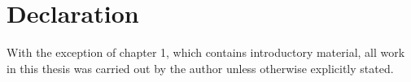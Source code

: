 \chapter{Declaration}

With the exception of chapter 1, which contains introductory material, all work in this thesis was carried out by the author unless otherwise explicitly stated.
